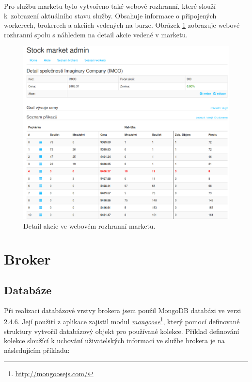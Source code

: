\documentclass[thesis=M,czech]{FITthesis}[2012/06/26]
\newcommand\fnurl[2]{\href{#2}{#1}\footnote{\url{#2}}}
\begin{document}
	Pro službu marketu bylo vytvořeno také webové rozhranní, které slouží k~zobrazení aktuálního stavu služby. Obsahuje informace o připojených workerech, brokerech a akciích vedených na burze. Obrázek \ref{fig:market_stock_detail} zobrazuje webové rozhranní spolu s náhledem na detail akcie vedené v marketu.

\begin{figure}[h]
	\centering
	\includegraphics[width=1\textwidth]{images/market_stock_detail}
 	\caption[Detail akcie ve webovém rozhranní marketu]{Detail akcie ve webovém rozhranní marketu.}
 	\label{fig:market_stock_detail} 	
\end{figure}

\section{Broker}
	
\subsection{Databáze}

	Při realizaci databázové vrstvy brokera jsem použil MongoDB databázi ve verzi 2.4.6. Její použití z aplikace zajistil modul \fnurl{\textit{mongoose}}{http://mongoosejs.com/}, který pomocí definované struktury vytvořil databázový objekt pro používané kolekce. Příklad definování kolekce sloužící k uchování uživatelských informací ve službe brokera je na následujícím příkladu:
	
\end{document}
